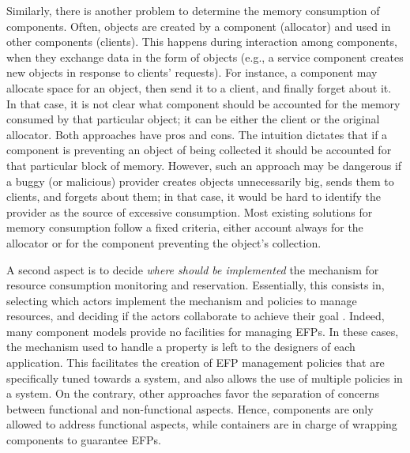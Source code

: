 Similarly, there is another problem to determine the memory consumption of components.
Often, objects are created by a component (allocator) and used in other components (clients).
This happens during interaction among components, when they exchange data in the form of objects (e.g., a service component creates new objects in response to clients' requests).
For instance, a component may allocate space for an object, then send it to a client, and finally forget about it.
In that case, it is not clear what component should be accounted for the memory consumed by that particular object; it can be either the client or the original allocator.
Both approaches have pros and cons.
The intuition dictates that if a component is preventing an object of being collected it should be accounted for that particular block of memory.
However, such an approach may be dangerous if a buggy (or malicious) provider creates objects unnecessarily big, sends them to clients, and forgets about them; in that case, it would be hard to identify the provider as the source of excessive consumption. 
Most existing solutions for memory consumption follow a fixed criteria, either account always for the allocator or for the component preventing the object's collection.

A second aspect is to decide \textit{where should be implemented} the mechanism for resource consumption monitoring and reservation.
Essentially, this consists in, selecting which actors implement the mechanism and policies to manage resources, and deciding if the actors collaborate to achieve their goal \cite{Crnkovic2011}.
Indeed, many component models provide no facilities for managing \glspl{EFP}.
In these cases, the mechanism used to handle a property is left to the designers of each application.
This facilitates the creation of EFP management policies that are specifically tuned towards a system, and also allows the use of multiple policies in a system.
On the contrary, other approaches favor the separation of concerns between functional and non-functional aspects.
Hence, components are only allowed to address functional aspects, while containers are in charge of wrapping components to guarantee EFPs.

